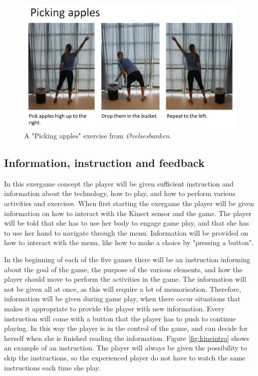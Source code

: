 \begin{figure} [H]
\centering
\includegraphics[scale=0.5]{PickingApplesAlone.jpg}
\caption[Exercise - picking apples]{A "Picking apples" exercise from \emph{Øvelsesbanken}.}
\label{pickingapples}
\end{figure}

\subsection{Information, instruction and feedback}
In this exergame concept the player will be given sufficient instruction and information about the technology, how to play, and how to perform various activities and exercises. When first starting the exergame the player will be given information on how to interact with the Kinect sensor and the game. The player will be told that she has to use her body to engage game play, and that she has to use her hand to navigate through the menu. Information will be provided on how to interact with the menu, like how to make a choice by "pressing a button". 

In the beginning of each of the five games there will be an instruction informing about the goal of the game, the purpose of the various elements, and how the player should move to perform the activities in the game. The information will not be given all at once, as this will require a lot of memorisation. Therefore, information will be given during game play, when there occur situations that makes it appropriate to provide the player with new information. Every instruction will come with a button that the player has to push to continue playing. In this way the player is in the control of the game, and can decide for herself when she is finished reading the information. Figure \ref{fig:kineintro} shows an example of an instruction. The player will always be given the possibility to skip the instructions, so the experienced player do not have to watch the same instructions each time she play.

